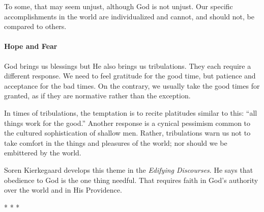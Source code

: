 To some, that may seem unjust, although God is not unjust. Our specific accomplishments in the world are individualized and cannot, and should not, be compared to others.

\paragraph{Hope and Fear}


God brings us blessings but He also brings us tribulations. They each require a different response. We need to feel gratitude for the good time, but patience and acceptance for the bad times. On the contrary, we usually take the good times for granted, as if they are normative rather than the exception.

In times of tribulations, the temptation is to recite platitudes similar to this: ``all things work for the good.'' Another response is a cynical pessimism common to the cultured sophistication of shallow men. Rather, tribulations warn us not to take comfort in the things and pleasures of the world; nor should we be embittered by the world.

Soren Kierkegaard develops this theme in the \emph{Edifying Discourses}. He says that obedience to God is the one thing needful. That requires faith in God's authority over the world and in His Providence.



\begin{center}* * *\end{center}

